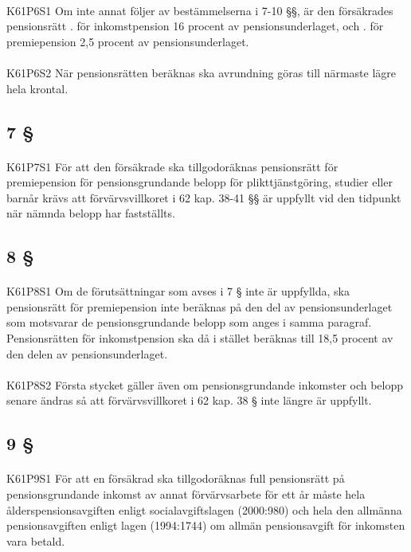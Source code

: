 \documentclass[a4paper,notitlepage,openany,10pt]{book}
\begin{document}
\paragraph*{}
{\tiny K61P6S1}
Om inte annat följer av bestämmelserna i 7-10 §§, är den försäkrades pensionsrätt
. för inkomstpension 16 procent av pensionsunderlaget, och
. för premiepension 2,5 procent av pensionsunderlaget.
\paragraph*{}
{\tiny K61P6S2}
När pensionsrätten beräknas ska avrundning göras till närmaste lägre hela krontal.
\subsection*{7 §}
\paragraph*{}
{\tiny K61P7S1}
För att den försäkrade ska tillgodoräknas pensionsrätt för premiepension för pensionsgrundande belopp för plikttjänstgöring, studier eller barnår krävs att förvärvsvillkoret i 62 kap. 38-41 §§ är uppfyllt vid den tidpunkt när nämnda belopp har fastställts.
\subsection*{8 §}
\paragraph*{}
{\tiny K61P8S1}
Om de förutsättningar som avses i 7 § inte är uppfyllda, ska pensionsrätt för premiepension inte beräknas på den del av pensionsunderlaget som motsvarar de pensionsgrundande belopp som anges i samma paragraf. Pensionsrätten för inkomstpension ska då i stället beräknas till 18,5 procent av den delen av pensionsunderlaget.
\paragraph*{}
{\tiny K61P8S2}
Första stycket gäller även om pensionsgrundande inkomster och belopp senare ändras så att förvärvsvillkoret i 62 kap. 38 § inte längre är uppfyllt.
\subsection*{9 §}
\paragraph*{}
{\tiny K61P9S1}
För att en försäkrad ska tillgodoräknas full pensionsrätt på pensionsgrundande inkomst av annat förvärvsarbete för ett år måste hela ålderspensionsavgiften enligt socialavgiftslagen (2000:980) och hela den allmänna pensionsavgiften enligt lagen (1994:1744) om allmän pensionsavgift för inkomsten vara betald.
\end{document}
